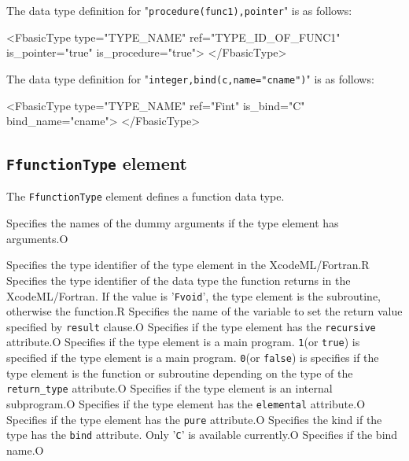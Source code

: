 The data type definition for "{\tt procedure(func1),pointer}" is as follows:
\vspace{2mm}

\begin{XcodeMLFExample}
<FbasicType type="TYPE_NAME" ref="TYPE_ID_OF_FUNC1" is_pointer="true"
 is_procedure="true">
</FbasicType>
\end{XcodeMLFExample}

The data type definition for "{\tt integer,bind(c,name="cname")}" is as follows:
\vspace{2mm}

\begin{XcodeMLFExample}
<FbasicType type="TYPE_NAME" ref="Fint" is_bind="C" bind_name="cname">
</FbasicType>
\end{XcodeMLFExample}


\subsection{ {\tt FfunctionType} element}

The {\tt FfunctionType} element defines a function data type.


\begin{XcodeMLChildElements}
{Specifies the names of the dummy arguments if the type element has arguments.}{O}
\end{XcodeMLChildElements}

\begin{XcodeMLAttributes}
{Specifies the type identifier of the type element in the XcodeML/Fortran.}{R}
{Specifies the type identifier of the data type the function returns in the XcodeML/Fortran.
If the value is '{\tt Fvoid}', the type element is the subroutine, otherwise the function.}{R}
{Specifies the name of the variable to set the return value specified by {\tt result} clause.}{O}
{Specifies if the type element has the {\tt recursive} attribute.}{O}
{Specifies if the type element is a main program.
{\tt 1}(or {\tt true}) is specified if the type element is a main program.
{\tt 0}(or {\tt false}) is specifies if the type element is the function or subroutine depending on the type of the {\tt return\_type} attribute.}{O}
{Specifies if the type element is an internal subprogram.}{O}
{Specifies if the type element has the {\tt elemental} attribute.}{O}
{Specifies if the type element has the {\tt pure} attribute.}{O}
{Specifies the kind if the type has the {\tt bind} attribute. Only '{\tt C}' is available currently.}{O}
{Specifies if the bind name.}{O}
\end{XcodeMLAttributes}


